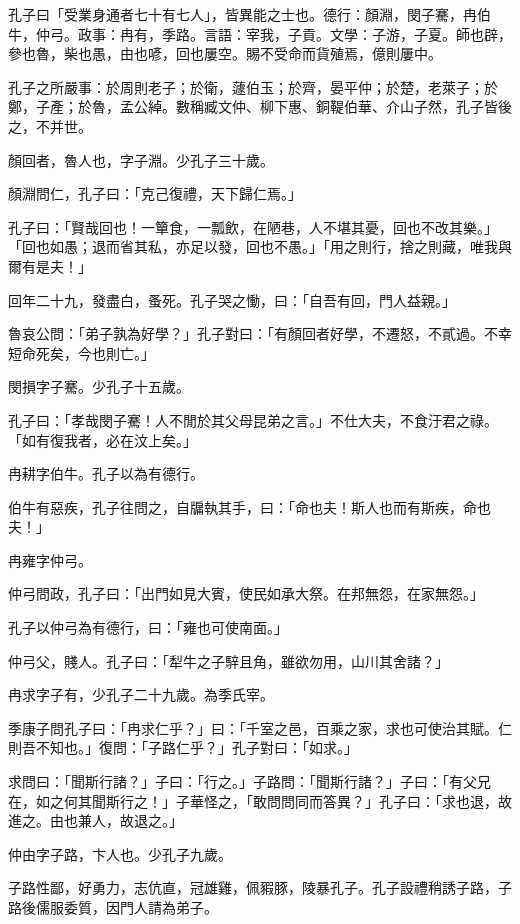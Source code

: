 
\begin{pinyinscope}
孔子曰「受業身通者七十有七人」，皆異能之士也。德行：顏淵，閔子騫，冉伯牛，仲弓。政事：冉有，季路。言語：宰我，子貢。文學：子游，子夏。師也辟，參也魯，柴也愚，由也喭，回也屢空。賜不受命而貨殖焉，億則屢中。

孔子之所嚴事：於周則老子；於衛，蘧伯玉；於齊，晏平仲；於楚，老萊子；於鄭，子產；於魯，孟公綽。數稱臧文仲、柳下惠、銅鞮伯華、介山子然，孔子皆後之，不并世。

顏回者，魯人也，字子淵。少孔子三十歲。

顏淵問仁，孔子曰：「克己復禮，天下歸仁焉。」

孔子曰：「賢哉回也！一簞食，一瓢飲，在陋巷，人不堪其憂，回也不改其樂。」「回也如愚；退而省其私，亦足以發，回也不愚。」「用之則行，捨之則藏，唯我與爾有是夫！」

回年二十九，發盡白，蚤死。孔子哭之慟，曰：「自吾有回，門人益親。」

魯哀公問：「弟子孰為好學？」孔子對曰：「有顏回者好學，不遷怒，不貳過。不幸短命死矣，今也則亡。」

閔損字子騫。少孔子十五歲。

孔子曰：「孝哉閔子騫！人不閒於其父母昆弟之言。」不仕大夫，不食汙君之祿。「如有復我者，必在汶上矣。」

冉耕字伯牛。孔子以為有德行。

伯牛有惡疾，孔子往問之，自牖執其手，曰：「命也夫！斯人也而有斯疾，命也夫！」

冉雍字仲弓。

仲弓問政，孔子曰：「出門如見大賓，使民如承大祭。在邦無怨，在家無怨。」

孔子以仲弓為有德行，曰：「雍也可使南面。」

仲弓父，賤人。孔子曰：「犁牛之子騂且角，雖欲勿用，山川其舍諸？」

冉求字子有，少孔子二十九歲。為季氏宰。

季康子問孔子曰：「冉求仁乎？」曰：「千室之邑，百乘之家，求也可使治其賦。仁則吾不知也。」復問：「子路仁乎？」孔子對曰：「如求。」

求問曰：「聞斯行諸？」子曰：「行之。」子路問：「聞斯行諸？」子曰：「有父兄在，如之何其聞斯行之！」子華怪之，「敢問問同而答異？」孔子曰：「求也退，故進之。由也兼人，故退之。」

仲由字子路，卞人也。少孔子九歲。

子路性鄙，好勇力，志伉直，冠雄雞，佩豭豚，陵暴孔子。孔子設禮稍誘子路，子路後儒服委質，因門人請為弟子。


\end{pinyinscope}
